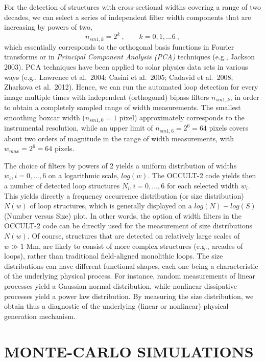 \documentclass[10pt,preprint]{aastex}  %
\begin{document}
For the detection of structures with cross-sectional widths
covering a range of two decades, we can select a series of 
independent filter width components that are increasing by 
powers of two,
\begin{equation} 
	n_{sm1,k} = 2^k \ , 
	\qquad k = 0, 1, ... 6 \ ,
\end{equation}
which essentially corresponds to the orthogonal basis functions 
in Fourier 
transforms or in {\sl Principal Component Analysis (PCA)} techniques 
(e.g., Jackson 2003). PCA techniques have been applied to solar
physics data sets in various ways (e.g., Lawrence et al.~2004;
Casini et al.~2005; Cadavid et al.~2008; Zharkova et al.~2012).
Hence, we can run the automated loop detection for every image
multiple times with independent (orthogonal) bipass filters $n_{sm1,k}$,
in order to obtain a completely sampled range of width measurements.
The smallest smoothing boxcar width ($n_{sm1,0}=1$ pixel) approximately 
corresponds to the instrumental resolution, while an upper limit of
$n_{sm1,6}=2^6=64$ pixels covers about two orders of magnitude in
the range of width measurements, with $w_{max} = 2^6 = 64$ pixels.

The choice of filters by powers of 2 yields a uniform distribution
of widths $w_i, i=0,...,6$ on a logarithmic scale, $log{(w)}$.
The OCCULT-2 code yields then a number of detected loop structures
$N_i, i=0,...,6$ for each selected width $w_i$. This yields directly
a frequency occurrence distribution (or size distribution) $N(w)$ 
of loop structures, which is generally displayed on a 
$log(N)-log(S)$ (Number versus Size) plot. 
In other words, the option of width filters in the OCCULT-2 code 
can be directly used for the measurement of size distributions $N(w)$.
Of course, structures that are detected on relatively large scales
of $w \gg 1$ Mm, are likely to consist of more complex structures (e.g., 
arcades of loops), rather than traditional field-aligned monolithic loops.
The size distributions can have different functional shapes, each one
being a characteristic of the underlying physical process. For instance,
random measurements of linear processes yield a Gaussian normal
distribution, while nonlinear dissipative processes yield a 
power law distribution. By measuring the size distribution, we obtain
thus a diagnostic of the underlying (linear or nonlinear)
physical generation mechanism.

\section{	MONTE-CARLO SIMULATIONS			}
\end{document}
